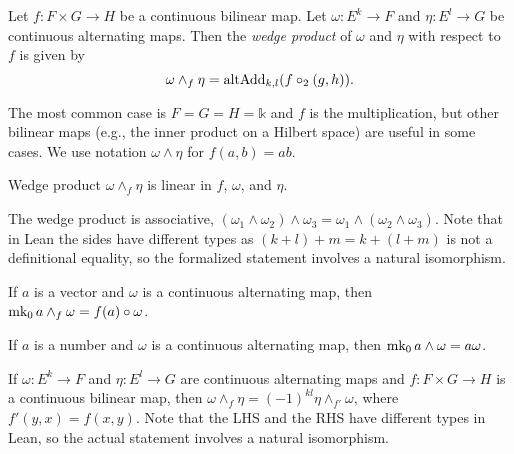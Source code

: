 \begin{definition}
  Let \(f \colon F \times G \to H\) be a continuous bilinear map.
  Let \(\omega \colon E^{k} \to F\) and \(\eta\colon E^{l}\to G\) be continuous alternating maps.
  Then the \emph{wedge product} of \(\omega\) and \(\eta\) with respect to \(f\) is given by
  \[
    \omega \wedge_{f} \eta = \operatorname{altAdd}_{k, l}(f \circ_{2}(g, h)).
  \]
\end{definition}

The most common case is \(F = G = H = \mathbb k\) and \(f\) is the multiplication,
but other bilinear maps (e.g., the inner product on a Hilbert space) are useful in some cases.
We use notation \(\omega \wedge \eta\) for \(f(a, b) = ab\).


\begin{theorem}
  Wedge product \(\omega \wedge_{f} \eta\) is linear in \(f\), \(\omega\), and \(\eta\).
\end{theorem}

\begin{theorem}
  The wedge product is associative, \((\omega_{1}\wedge \omega_{2})\wedge \omega_{3} = \omega_{1}\wedge (\omega_{2}\wedge \omega_{3})\).
  Note that in Lean the sides have different types as \((k + l) + m = k + (l + m)\) is not a definitional equality,
  so the formalized statement involves a natural isomorphism.
\end{theorem}

\begin{theorem}
  If \(a\) is a vector and \(\omega\) is a continuous alternating map,
  then \(\operatorname{mk_0} a \wedge_{f} \omega = f(a) \circ \omega\).
\end{theorem}

\begin{theorem}
  If \(a\) is a number and \(\omega\) is a continuous alternating map,
  then \(\operatorname{mk_0} a \wedge \omega = a\omega\).
\end{theorem}

\begin{theorem}
  If \(\omega\colon E^{k}\to F\) and \(\eta\colon E^{l}\to G\) are continuous alternating maps
  and \(f \colon F \times G \to H\) is a continuous bilinear map,
  then \(\omega \wedge_{f} \eta = {(-1)}^{kl}\eta \wedge_{f'} \omega\),
  where \(f'(y, x) = f(x, y)\).
  Note that the LHS and the RHS have different types in Lean,
  so the actual statement involves a natural isomorphism.
\end{theorem}

